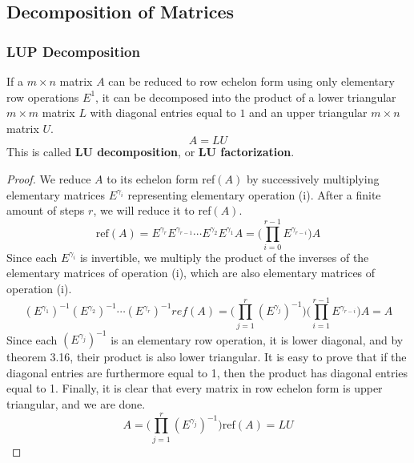 \subsection{Decomposition of Matrices}

\subsubsection{LUP Decomposition}

  \begin{theorem}[LU Decompositions]
    If a $m \times n$ matrix $A$ can be reduced to row echelon form using only elementary row operations $E^1$, it can be decomposed into the product of a lower triangular $m \times m$ matrix $L$ with diagonal entries equal to $1$ and an upper triangular $m \times n$ matrix $U$. 
    \begin{equation}
      A = L U
    \end{equation}
    This is called \textbf{LU decomposition}, or \textbf{LU factorization}. 
  \end{theorem}
  \begin{proof}
    We reduce $A$ to its echelon form ref$(A)$ by successively multiplying elementary matrices $E^{\gamma_i}$ representing elementary operation (i). After a finite amount of steps $r$, we will reduce it to ref$(A)$.
    \begin{equation}
      \text{ref}(A) = E^{\gamma_r} E^{\gamma_{r-1}} \cdots E^{\gamma_2} E^{\gamma_1} A = \bigg(\prod_{i = 0}^{r-1} E^{\gamma_{r-i}}\bigg) A
    \end{equation}
    Since each $E^{\gamma_i}$ is invertible, we multiply the product of the inverses of the elementary matrices of operation (i), which are also elementary matrices of operation (i). 
    \begin{equation}
      (E^{\gamma_1})^{-1} (E^{\gamma_2})^{-1} \cdots (E^{\gamma_r})^{-1} ref(A) = \bigg( \prod_{j = 1}^r (E^{\gamma_j})^{-1} \bigg) \bigg( \prod_{i=1}^{r-1} E^{\gamma_{r-i}} \bigg) A = A
    \end{equation}
    Since each $(E^{\gamma_j})^{-1}$ is an elementary row operation, it is lower diagonal, and by theorem 3.16, their product is also lower triangular. It is easy to prove that if the diagonal entries are furthermore equal to 1, then the product has diagonal entries equal to 1. Finally, it is clear that every matrix in row echelon form is upper triangular, and we are done. 
    \begin{equation}
      A = \bigg( \prod_{j = 1}^r (E^{\gamma_j})^{-1} \bigg) \text{ref}(A) = L U
    \end{equation}
  \end{proof}

